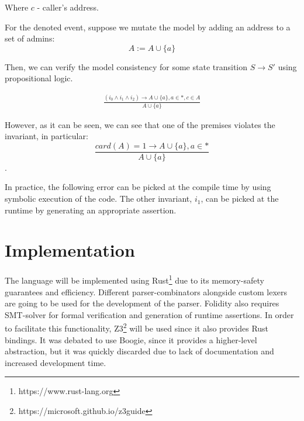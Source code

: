 \documentclass[oneside]{ecsproject}     %
\begin{document}
Where $c$ - caller's address.

For the denoted event, suppose we mutate the model by adding an address to a set of admins:
\begin{equation*}
  A := A \cup \{a\}
\end{equation*}

Then, we can verify the model consistency for some state transition $S \to S'$ using propositional logic.

\begin{equation*}
  \begin{gathered} 
   \frac{(i_0 \wedge i_1 \wedge i_2 ) \rightarrow A \cup \{a\}, a \in *, c \in A}{A \cup \{a\}}
  \end{gathered}
\end{equation*}

However, as it can be seen, we can see that one of the premises violates the invariant, in particular:
\begin{equation*}
  \frac{card(A) = 1 \rightarrow A \cup \{a\}, a \in *}{A \cup \{a\}}
\end{equation*}.

In practice, the following error can be picked at the compile time by using symbolic execution of the code.
The other invariant, $i_1$, can be picked at the runtime by generating an appropriate assertion.

\section{Implementation}

The language will be implemented using Rust\footnote{https://www.rust-lang.org} due to its memory-safety guarantees and efficiency. 
Different parser-combinators alongside custom lexers are going to be used for the development of the parser. 
Folidity also requires SMT-solver for formal verification and generation of runtime assertions. In order to facilitate this functionality,
Z3\footnote{https://microsoft.github.io/z3guide} will be used since it also provides Rust bindings. It was debated to use Boogie, since it provides
a higher-level abstraction, but it was quickly discarded due to lack of documentation and increased development time.
\end{document}
